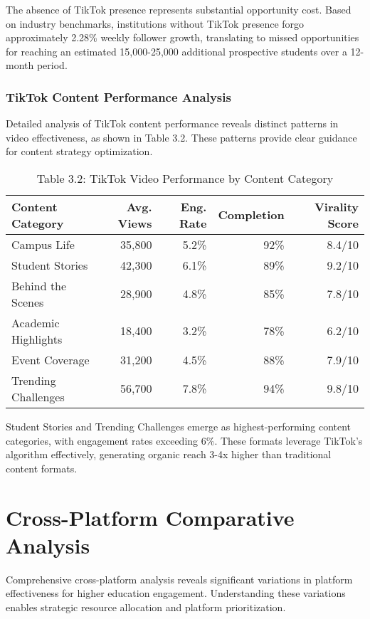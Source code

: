 \documentclass[12pt]{report}
\begin{document}
The absence of TikTok presence represents substantial opportunity cost. Based on industry benchmarks, institutions without TikTok presence forgo approximately 2.28\% weekly follower growth, translating to missed opportunities for reaching an estimated 15,000-25,000 additional prospective students over a 12-month period.

\subsection{TikTok Content Performance Analysis}

Detailed analysis of TikTok content performance reveals distinct patterns in video effectiveness, as shown in Table 3.2. These patterns provide clear guidance for content strategy optimization.

\begin{table}[h]
\centering
\caption{Table 3.2: TikTok Video Performance by Content Category}
\begin{tabular}{@{}lrrrr@{}}
\toprule
\textbf{Content Category} & \textbf{Avg. Views} & \textbf{Eng. Rate} & \textbf{Completion} & \textbf{Virality Score} \\
\midrule
Campus Life & 35,800 & 5.2\% & 92\% & 8.4/10 \\
Student Stories & 42,300 & 6.1\% & 89\% & 9.2/10 \\
Behind the Scenes & 28,900 & 4.8\% & 85\% & 7.8/10 \\
Academic Highlights & 18,400 & 3.2\% & 78\% & 6.2/10 \\
Event Coverage & 31,200 & 4.5\% & 88\% & 7.9/10 \\
Trending Challenges & 56,700 & 7.8\% & 94\% & 9.8/10 \\
\bottomrule
\end{tabular}
\end{table}

Student Stories and Trending Challenges emerge as highest-performing content categories, with engagement rates exceeding 6\%. These formats leverage TikTok's algorithm effectively, generating organic reach 3-4x higher than traditional content formats.

\chapter{Cross-Platform Comparative Analysis}

Comprehensive cross-platform analysis reveals significant variations in platform effectiveness for higher education engagement. Understanding these variations enables strategic resource allocation and platform prioritization.
\end{document}
